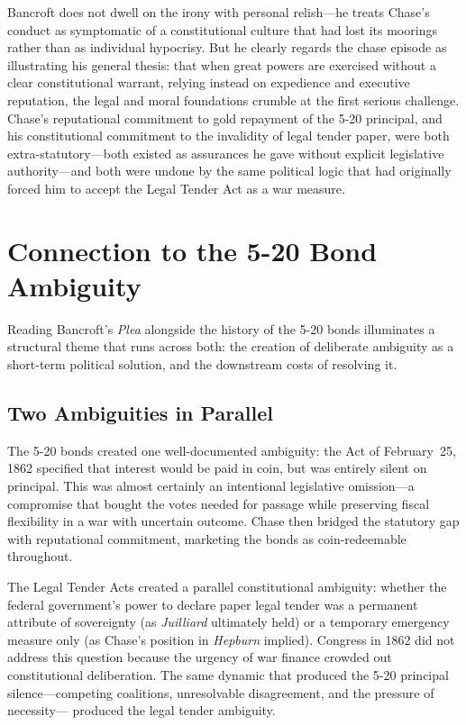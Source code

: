 \documentclass[12pt]{article}
\begin{document}
Bancroft does not dwell on the irony with personal relish---he treats
Chase's conduct as symptomatic of a constitutional culture that had
lost its moorings rather than as individual hypocrisy. But he clearly
regards the chase episode as illustrating his general thesis: that when
great powers are exercised without a clear constitutional warrant, relying
instead on expedience and executive reputation, the legal and moral
foundations crumble at the first serious challenge. Chase's reputational
commitment to gold repayment of the 5-20 principal, and his
constitutional commitment to the invalidity of legal tender paper, were
both extra-statutory---both existed as assurances he gave without
explicit legislative authority---and both were undone by the same
political logic that had originally forced him to accept the Legal Tender
Act as a war measure.

\section{Connection to the 5-20 Bond Ambiguity}

Reading Bancroft's \textit{Plea} alongside the history of the 5-20 bonds
illuminates a structural theme that runs across both: the creation of
deliberate ambiguity as a short-term political solution, and the
downstream costs of resolving it.

\subsection{Two Ambiguities in Parallel}

The 5-20 bonds created one well-documented ambiguity: the Act of
February~25, 1862 specified that interest would be paid in coin, but was
entirely silent on principal. This was almost certainly an intentional
legislative omission---a compromise that bought the votes needed for
passage while preserving fiscal flexibility in a war with uncertain
outcome. Chase then bridged the statutory gap with reputational
commitment, marketing the bonds as coin-redeemable throughout.

The Legal Tender Acts created a parallel constitutional ambiguity: whether
the federal government's power to declare paper legal tender was a
permanent attribute of sovereignty (as \textit{Juilliard} ultimately
held) or a temporary emergency measure only (as Chase's position in
\textit{Hepburn} implied). Congress in 1862 did not address this question
because the urgency of war finance crowded out constitutional deliberation.
The same dynamic that produced the 5-20 principal silence---competing
coalitions, unresolvable disagreement, and the pressure of necessity---
produced the legal tender ambiguity.
\end{document}
